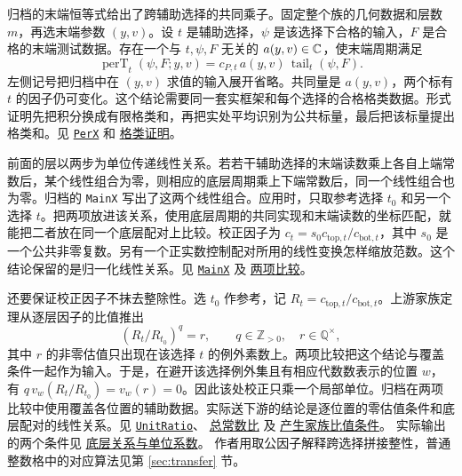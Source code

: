\documentclass[UTF8,fontset=none,a4paper,11pt]{ctexart}
\theoremstyle{definition}
\newcommand{\src}[3]{\href{https://github.com/leanprover-community/riemann-hypothesis/blob/23aebbb302010b292314d406aa97f7901d698634/src/#1.lean\#L#2}{#3}}
\begin{document}
归档的末端恒等式给出了跨辅助选择的共同乘子。固定整个族的几何数据和层数 $m$，再选末端参数 $(y,v)$。设 $t$ 是辅助选择，$\psi$ 是该选择下合格的输入，$F$ 是合格的末端测试数据。存在一个与 $t,\psi,F$ 无关的 $a(y,v)\in\mathbb C$，使末端周期满足
\[
 \operatorname{perT}_t(\psi,F;y,v)=c_{P,t}\,a(y,v)\,
       \operatorname{tail}_t(\psi,F).
\]
左侧记号把归档中在 $(y,v)$ 求值的输入展开省略。共同量是 $a(y,v)$，两个标有 $t$ 的因子仍可变化。这个结论需要同一套实框架和每个选择的合格格类数据。形式证明先把积分换成有限格类和，再把实处平均识别为公共标量，最后把该标量提出格类和。见
\src{Development/AbelianVarietyTheory/Definitions/LatticeFrames/ValLastX}{205}{\texttt{PerX}}
和
\src{Development/AbelianVarietyTheory/Proofs/DecoratedLatticeProofs/SeeSawLastPeriodFactorizationOfClassData}{72}{格类证明}。

前面的层以两步为单位传递线性关系。若若干辅助选择的末端读数乘上各自上端常数后，某个线性组合为零，则相应的底层周期乘上下端常数后，同一个线性组合也为零。归档的 \texttt{MainX} 写出了这两个线性组合。应用时，只取参考选择 $t_0$ 和另一个选择 $t$。把两项放进该关系，使用底层周期的共同实现和末端读数的坐标匹配，就能把二者放在同一个底层配对上比较。校正因子为 $c_t=s_0c_{\mathrm{top},t}/c_{\mathrm{bot},t}$，其中 $s_0$ 是一个公共非零复数。另有一个正实数控制配对所用的线性变换怎样缩放范数。这个结论保留的是归一化线性关系。见
\src{Development/AbelianVarietyTheory/Definitions/LatticeFrames/ValLastX}{244}{\texttt{MainX}}
及
\src{Development/AutomorphicArithmetic/ThetaCorrespondence/ThetaPairLifts/ThirdPlaceSeries/RelOfLinks}{22}{两项比较}。

还要保证校正因子不抹去整除性。选 $t_0$ 作参考，记 $R_t=c_{\mathrm{top},t}/c_{\mathrm{bot},t}$。上游家族定理从逐层因子的比值推出
\[
 (R_t/R_{t_0})^q=r,\qquad q\in\mathbb Z_{>0},\quad r\in\mathbb Q^\times,
\]
其中 $r$ 的非零估值只出现在该选择 $t$ 的例外素数上。两项比较把这个结论与覆盖条件一起作为输入。于是，在避开该选择例外集且有相应代数数表示的位置 $w$，有
$q\,v_w(R_t/R_{t_0})=v_w(r)=0$。因此该处校正只乘一个局部单位。归档在两项比较中使用覆盖各位置的辅助数据。实际送下游的结论是逐位置的零估值条件和底层配对的线性关系。见
\src{Development/AbelianVarietyTheory/Definitions/LatticeFrames/UnitRatio}{22}{\texttt{UnitRatio}}、
\src{Development/AbelianVarietyTheory/Proofs/DecoratedLatticeProofs/SeeSawTotalConstantRatioOfFactorRatiosStatement}{13}{总常数比}
及
\src{Development/AutomorphicArithmetic/ThetaCorrespondence/ThetaPairLifts/ThirdPlaceSeries/LawsLinksOfGeoRowsCols}{187}{产生家族比值条件}。
实际输出的两个条件见
\src{Development/AutomorphicArithmetic/ThetaCorrespondence/ThetaPairLifts/ThirdPlaceSeries/FormsAtZero}{59}{底层关系与单位系数}。
作者用取公因子解释跨选择拼接整性，普通整数格中的对应算法见第 \ref{sec:transfer} 节。
\end{document}
